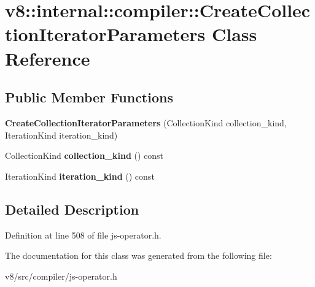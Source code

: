 \hypertarget{classv8_1_1internal_1_1compiler_1_1CreateCollectionIteratorParameters}{}\section{v8\+:\+:internal\+:\+:compiler\+:\+:Create\+Collection\+Iterator\+Parameters Class Reference}
\label{classv8_1_1internal_1_1compiler_1_1CreateCollectionIteratorParameters}
\subsection*{Public Member Functions}
\begin{DoxyCompactItemize}
\item 
\mbox{\label{classv8_1_1internal_1_1compiler_1_1CreateCollectionIteratorParameters_afeaea67e641b97e44f22a4725c2f0bc0}} 
{\bfseries Create\+Collection\+Iterator\+Parameters} (Collection\+Kind collection\+\_\+kind, Iteration\+Kind iteration\+\_\+kind)
\item 
\mbox{\label{classv8_1_1internal_1_1compiler_1_1CreateCollectionIteratorParameters_a4817e35f843e9d6c26b90b4f76006dc6}} 
Collection\+Kind {\bfseries collection\+\_\+kind} () const
\item 
\mbox{\label{classv8_1_1internal_1_1compiler_1_1CreateCollectionIteratorParameters_a112f91c8bd0e93ccfbffd476378a7faa}} 
Iteration\+Kind {\bfseries iteration\+\_\+kind} () const
\end{DoxyCompactItemize}


\subsection{Detailed Description}


Definition at line 508 of file js-\/operator.\+h.



The documentation for this class was generated from the following file\+:\begin{DoxyCompactItemize}
\item 
v8/src/compiler/js-\/operator.\+h\end{DoxyCompactItemize}
